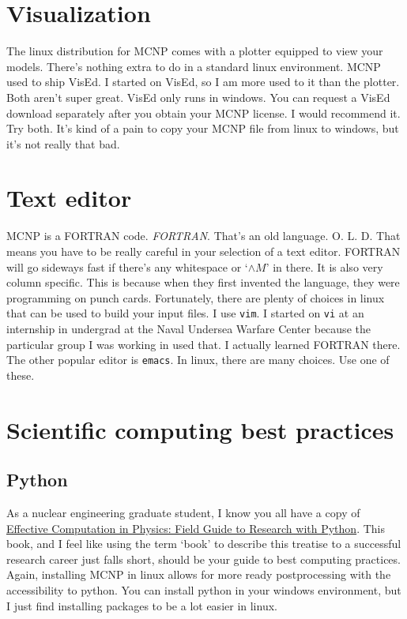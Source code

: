 \documentclass[11pt,a4paper]{article}
\begin{document}
\section{Visualization}
\noindent The linux distribution for MCNP comes with a plotter equipped to view your models. There's nothing extra to do in a standard linux environment. MCNP used to ship VisEd. I started on VisEd, so I am more used to it than the plotter. Both aren't super great. VisEd only runs in windows. You can request a VisEd download separately after you obtain your MCNP license. I would recommend it. Try both. It's kind of a pain to copy your MCNP file from linux to windows, but it's not really that bad.

\section{Text editor}
\noindent MCNP is a FORTRAN code. \textit{FORTRAN}. That's an old language. O. L. D. That means you have to be really careful in your selection of a text editor. FORTRAN will go sideways fast if there's any whitespace or `$\wedge M$' in there. It is also very column specific. This is because when they first invented the language, they were programming on punch cards. Fortunately, there are plenty of choices in linux that can be used to build your input files. I use \texttt{vim}. I started on \texttt{vi}
at an internship in undergrad at the Naval Undersea Warfare Center because the particular group I was working in used that. I actually learned FORTRAN there. The other popular editor is \texttt{emacs}. In linux, there are many choices. Use one of these. 

\section{Scientific computing best practices}
\subsection{Python}
\noindent As a nuclear engineering graduate student, I know you all have a copy of \href{https://www.google.com/books/edition/Effective_Computation_in_Physics/6IkNCgAAQBAJ?hl=en&gbpv=0}{Effective Computation in Physics: Field Guide to Research with Python}. This book, and I feel like using the term `book' to describe this treatise to a successful research career just falls short, should be your guide to best computing practices. Again, installing MCNP in linux allows for more ready
postprocessing with the accessibility to python. You can install python in your windows environment, but I just find installing packages to be a lot easier in linux. 
\end{document}
